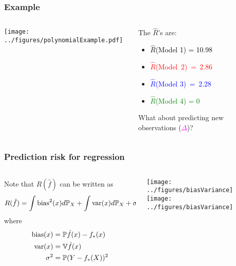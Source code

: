 \documentclass{beamer}
\begin{document}
\begin{frame}
\frametitle{Example}
\begin{columns}[T]
    \begin{column}{.55\textwidth}
  \texttt{[image: ../figures/polynomialExample.pdf]}
  \end{column}
    \begin{column}{.45\textwidth}
 The $\hat{R}$'s are: 
 \begin{itemize}
 \item[] \textcolor{black}{$\hat{R}$(Model 1) = 10.98}
 \item[] \textcolor{red}{$\hat{R}$(Model~2)~=~2.86}
 \item[] \textcolor{blue}{$\hat{R}$(Model 3)~=~2.28}
 \item[] \textcolor{green}{$\hat{R}$(Model 4) = 0}
 \end{itemize}
\vsp

What about predicting new observations (\textcolor{magenta}{$\Delta$})?
    \end{column}
  \end{columns}
  \end{frame}





\begin{frame}
\frametitle{Prediction risk for regression}



\begin{columns}[T]
    \begin{column}{.6\textwidth}
Note that $R(\hat{f})$ can be written as
\[
R(\hat{f}) = \int \textrm{bias}^2(x) d\P_X + \int \textrm{var}(x) d\P_X + \sigma^2
\]
where
\begin{align*}
\textrm{bias}(x) & = \P\hat{f}(x) - f_*(x)\\
\textrm{var}(x) & = \V\hat{f}(x) \\
\sigma^2 & = \P(Y - f_*(X))^2
\end{align*}

\vsp
{}

\end{column}
    \begin{column}{.4\textwidth}
\texttt{[image: ../figures/biasVariance]} \\
\texttt{[image: ../figures/biasVariance]}

\end{column}
\end{columns}
\end{frame}
\end{document}
